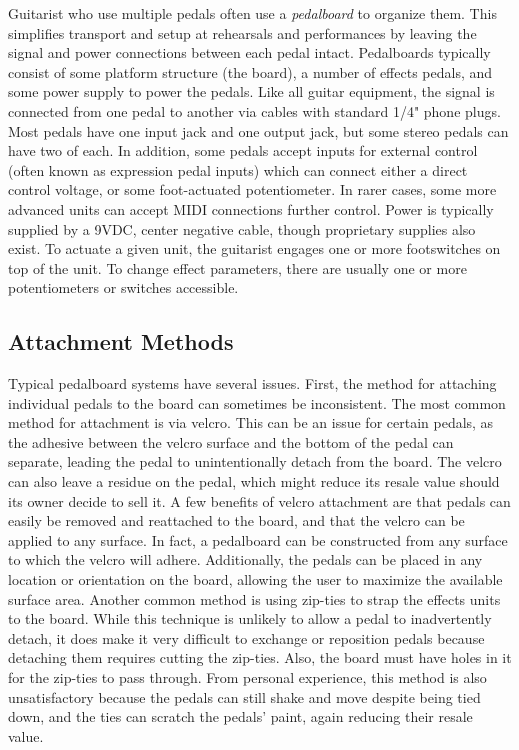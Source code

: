 \documentclass{article}
\begin{document}
Guitarist who use multiple pedals often use a \emph{pedalboard} to organize them.  This simplifies transport and setup at rehearsals and performances by leaving the signal and power connections between each pedal intact.  Pedalboards typically consist of some platform structure (the board), a number of effects pedals, and some power supply to power the pedals.  Like all guitar equipment, the signal is connected from one pedal to another via cables with standard 1/4" phone plugs.  Most pedals have one input jack and one output jack, but some stereo pedals can have two of each.  In addition, some pedals accept inputs for external control (often known as expression pedal inputs) which can connect either a direct control voltage, or some foot-actuated potentiometer.  In rarer cases, some more advanced units can accept MIDI connections further control.  Power is typically supplied by a 9VDC, center negative cable, though proprietary supplies also exist.  To actuate a given unit, the guitarist engages one or more footswitches on top of the unit.  To change effect parameters, there are usually one or more potentiometers or switches accessible.

\subsection{Attachment Methods}

Typical pedalboard systems have several issues.  First, the method for attaching individual pedals to the board can sometimes be inconsistent.  The most common method for attachment is via velcro.  This can be an issue for certain pedals, as the adhesive between the velcro surface and the bottom of the pedal can separate, leading the pedal to unintentionally detach from the board.  The velcro can also leave a residue on the pedal, which might reduce its resale value should its owner decide to sell it.  A few benefits of velcro attachment are that pedals can easily be removed and reattached to the board, and that the velcro can be applied to any surface.  In fact, a pedalboard can be constructed from any surface to which the velcro will adhere.  Additionally, the pedals can be placed in any location or orientation on the board, allowing the user to maximize the available surface area.  Another common method is using zip-ties to strap the effects units to the board.  While this technique is unlikely to allow a pedal to inadvertently detach, it does make it very difficult to exchange or reposition pedals because detaching them requires cutting the zip-ties.  Also, the board must have holes in it for the zip-ties to pass through.  From personal experience, this method is also unsatisfactory because the pedals can still shake and move despite being tied down, and the ties can scratch the pedals' paint, again reducing their resale value.
\end{document}
